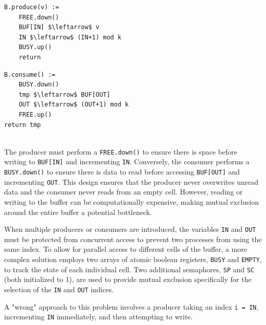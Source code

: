 \begin{minipage}{\textwidth}
\begin{minipage}{0.45\textwidth}
\begin{lstlisting}[mathescape]
B.produce(v) :=
    FREE.down()
    BUF[IN] $\leftarrow$ v
    IN $\leftarrow$ (IN+1) mod k
    BUSY.up()
    return
\end{lstlisting}
\end{minipage}
\hfill
\begin{minipage}{0.45\textwidth}
\begin{lstlisting}[mathescape]
B.consume() :=
    BUSY.down()
    tmp $\leftarrow$ BUF[OUT]
    OUT $\leftarrow$ (OUT+1) mod k
    FREE.up()
return tmp
\end{lstlisting}
\end{minipage}
\end{minipage}\\

The producer must perform a \texttt{FREE.down()} to ensure there is space before writing to \texttt{BUF[IN]} and incrementing \texttt{IN}. Conversely, the consumer performs a \texttt{BUSY.down()} to ensure there is data to read before accessing \texttt{BUF[OUT]} and incrementing \texttt{OUT}. This design ensures that the producer never overwrites unread data and the consumer never reads from an empty cell. However, reading or writing to the buffer can be computationally expensive, making mutual exclusion around the entire buffer a potential bottleneck.

When multiple producers or consumers are introduced, the variables \texttt{IN} and \texttt{OUT} must be protected from concurrent access to prevent two processes from using the same index. To allow for parallel access to different cells of the buffer, a more complex solution employs two arrays of atomic boolean registers, \texttt{BUSY} and \texttt{EMPTY}, to track the state of each individual cell. Two additional semaphores, \texttt{SP} and \texttt{SC} (both initialized to 1), are used to provide mutual exclusion specifically for the selection of the \texttt{IN} and \texttt{OUT} indices.

A "wrong" approach to this problem involves a producer taking an index \texttt{i = IN}, incrementing \texttt{IN} immediately, and then attempting to write.

